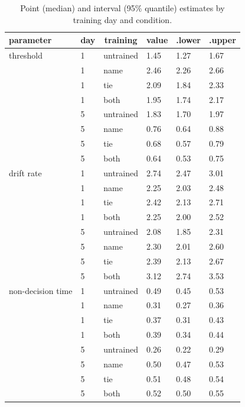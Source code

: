 \documentclass[
  english,
  man,floatsintext]{apa6}
\begin{document}
\begin{table}[tbp]

\begin{center}
\begin{threeparttable}

\caption{\label{tab:group-lba-table}Point (median) and interval (95\% quantile) estimates by training day and condition.}

\begin{tabular}{llllll}
\toprule
parameter & \multicolumn{1}{c}{day} & \multicolumn{1}{c}{training} & \multicolumn{1}{c}{value} & \multicolumn{1}{c}{.lower} & \multicolumn{1}{c}{.upper}\\
\midrule
threshold & 1 & untrained & 1.45 & 1.27 & 1.67\\
 & 1 & name & 2.46 & 2.26 & 2.66\\
 & 1 & tie & 2.09 & 1.84 & 2.33\\
 & 1 & both & 1.95 & 1.74 & 2.17\\
 & 5 & untrained & 1.83 & 1.70 & 1.97\\
 & 5 & name & 0.76 & 0.64 & 0.88\\
 & 5 & tie & 0.68 & 0.57 & 0.79\\
 & 5 & both & 0.64 & 0.53 & 0.75\\
drift rate & 1 & untrained & 2.74 & 2.47 & 3.01\\
 & 1 & name & 2.25 & 2.03 & 2.48\\
 & 1 & tie & 2.42 & 2.13 & 2.71\\
 & 1 & both & 2.25 & 2.00 & 2.52\\
 & 5 & untrained & 2.08 & 1.85 & 2.31\\
 & 5 & name & 2.30 & 2.01 & 2.60\\
 & 5 & tie & 2.39 & 2.13 & 2.67\\
 & 5 & both & 3.12 & 2.74 & 3.53\\
non-decision time & 1 & untrained & 0.49 & 0.45 & 0.53\\
 & 1 & name & 0.31 & 0.27 & 0.36\\
 & 1 & tie & 0.37 & 0.31 & 0.43\\
 & 1 & both & 0.39 & 0.34 & 0.44\\
 & 5 & untrained & 0.26 & 0.22 & 0.29\\
 & 5 & name & 0.50 & 0.47 & 0.53\\
 & 5 & tie & 0.51 & 0.48 & 0.54\\
 & 5 & both & 0.52 & 0.50 & 0.55\\
\bottomrule
\end{tabular}

\end{threeparttable}
\end{center}

\end{table}
\end{document}
